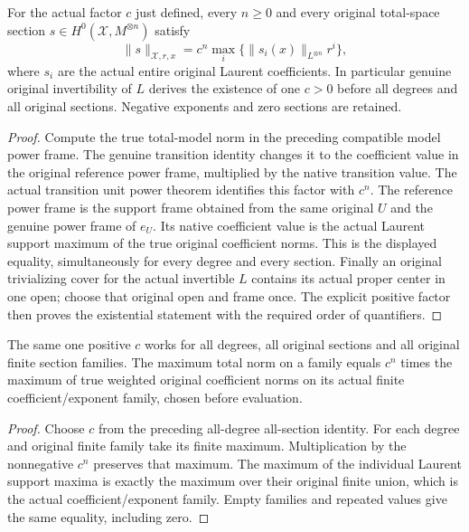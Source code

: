 \begin{theorem}\label{thm:native-tc-coherent-all-power-section-norms}
\leanok
{}
For the actual factor $c$ just defined, every $n\geq0$ and every
original total-space section $s\in H^0(\mathcal X,M^{\otimes n})$
satisfy
\[
 \lVert s\rVert_{\mathcal X,r,x}=c^n
 \max_i\{\lVert s_i(x)\rVert_{L^{\otimes n}}r^i\},
\]
where $s_i$ are the actual entire original Laurent coefficients.
In particular genuine original invertibility of $L$ derives the
existence of one $c>0$ before all degrees and all original
sections. Negative exponents and zero sections are retained.
\end{theorem}
\begin{proof}
Compute the true total-model norm in the preceding compatible
model power frame. The genuine transition identity changes it
to the coefficient value in the original reference power frame,
multiplied by the native transition value. The actual transition
unit power theorem identifies this factor with $c^n$. The
reference power frame is the support frame obtained from the
same original $U$ and the genuine power frame of $e_U$.
Its native coefficient value is the actual Laurent support
maximum of the true original coefficient norms. This is the
displayed equality, simultaneously for every degree and every
section. Finally an original trivializing cover for the actual
invertible $L$ contains its actual proper center in one open;
choose that original open and frame once. The explicit positive
factor then proves the existential statement with the required
order of quantifiers.
\end{proof}

\begin{corollary}\label{cor:native-tc-coherent-all-power-family-norms}
\leanok
{}
The same one positive $c$ works for all degrees, all original
sections and all original finite section families. The maximum
total norm on a family equals $c^n$ times the maximum of true
weighted original coefficient norms on its actual finite
coefficient/exponent family, chosen before evaluation.
\end{corollary}
\begin{proof}
Choose $c$ from the preceding all-degree all-section identity.
For each degree and original finite family take its finite
maximum. Multiplication by the nonnegative $c^n$ preserves that
maximum. The maximum of the individual Laurent support maxima
is exactly the maximum over their original finite union, which
is the actual coefficient/exponent family. Empty families and
repeated values give the same equality, including zero.
\end{proof}
